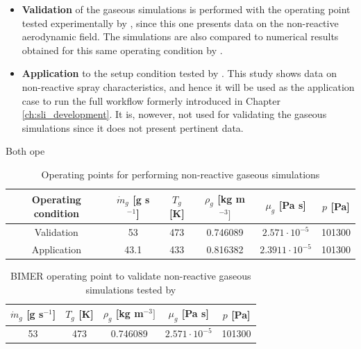 \begin{itemize}

	\item \textbf{Validation} of the gaseous simulations is performed with the operating point tested experimentally by , since this one presents data on the non-reactive aerodynamic field. The simulations are also compared to numerical results obtained for this same operating condition by . 
	
	\item \textbf{Application} to the setup condition tested by . This study shows data on non-reactive spray characteristics, and hence it will be used as the application case to run the full workflow formerly introduced in Chapter \ref{ch:sli_development}. It is, nowever, not used for validating the gaseous simulations since it does not present pertinent data.

\end{itemize}

Both ope

\begin{table}[!h]
\centering
\caption{Operating points for performing non-reactive gaseous simulations}
\begin{tabular}{|c|c|c|c|c|c|}
\hline
Operating condition   &  $\dot{m}_g$ [g s$^{-1}$] & $T_g$ [K] & $\rho_g$ [kg m$^{-3}]$  & $\mu_g$ [Pa s] & $p$ [Pa]  \\
\hline
\hline
Validation  & 53 & 473 & 0.746089 & $2.571 \cdot 10^{-5}$ & 101300 \\
\hline
Application  & 43.1 & 433 & 0.816382 & $2.3911 \cdot 10^{-5}$ & 101300 \\
\hline
\end{tabular}
\label{tab:gaseous_operating_points_BIMER}
\end{table}

\begin{table}[!h]
\centering
\caption{BIMER operating point to validate non-reactive gaseous simulations tested by }
\begin{tabular}{|c|c|c|c|c|}
\hline
$\dot{m}_g$ [g s$^{-1}$] & $T_g$ [K] & $\rho_g$ [kg m$^{-3}]$  & $\mu_g$ [Pa s] & $p$ [Pa]  \\
\hline
\hline
53 & 473 & 0.746089 & $2.571 \cdot 10^{-5}$ & 101300 \\
\hline
\end{tabular}
\label{tab:gaseous_operating_point_Providakis}
\end{table}



